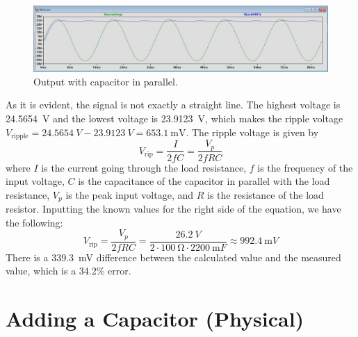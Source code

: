 \documentclass{article}
\begin{document}
\begin{figure}[h]
    \centering
    \includegraphics[width=\textwidth]{Images/RectCapacitor.jpg}
    \caption{Output with capacitor in parallel.}
    \label{fig8}
\end{figure}

As it is evident, the signal is not exactly a straight line.
The highest voltage is \SI{24.5654}{V} and the lowest voltage is
\SI{23.9123}{V}, which makes the ripple voltage
\(V_\text{ripple} = \SI{24.5654}{V} - \SI{23.9123}{V}
= \SI{653.1}{\milli\volt}\). The ripple voltage is given by
\begin{equation*}
    V_\text{rip} = \frac{I}{2fC} = \frac{V_p}{2fRC}
\end{equation*} where \(I\) is the current going through
the load resistance, \(f\) is the frequency of the input voltage,
\(C\) is the capacitance of the capacitor in parallel with the
load resistance, \(V_p\) is the peak input voltage, and
\(R\) is the resistance of the load resistor. Inputting the known
values for the right side of the equation, we have the following:
\begin{equation*}
    V_\text{rip} = \frac{V_p}{2fRC}
    = \frac{\SI{26.2}{V}}{2\cdot \SI{100}{\ohm} \cdot \SI{2200}{\milli F}}
    \approx \SI{992.4}{\milli V}
\end{equation*} There is a \SI{339.3}{mV} difference between
the calculated value and the measured value, which is a 
34.2\% error.

\section{Adding a Capacitor (Physical)}
\end{document}

